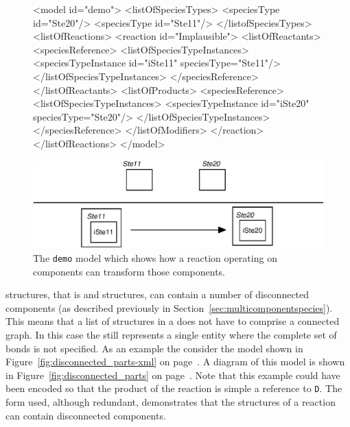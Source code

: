 \documentclass{cekarticle}
\begin{document}
\begin{figure}[h]

\begin{example}
<model id="demo">
    <listOfSpeciesTypes>
        <speciesType id="Ste20"/>
        <speciesType id="Ste11"/>
    </listofSpeciesTypes>
    <listOfReactions>
        <reaction id="Implausible">
            <listOfReactants>
                <speciesReference>
                    <listOfSpeciesTypeInstances>
                        <speciesTypeInstance id="iSte11" speciesType="Ste11"/>
                    </listOfSpeciesTypeInstances>
                </speciesReference>
            </listOfReactants>
            <listOfProducts>
                <speciesReference>
                    <listOfSpeciesTypeInstances>
                        <speciesTypeInstance id="iSte20" speciesType="Ste20"/>
                    </listOfSpeciesTypeInstances>
                </speciesReference>
            </listOfModifiers>
        </reaction>
    </listOfReactions>
</model>
\end{example}
  \vspace*{8pt}
  \centering
  \includegraphics[scale = 0.7]{demo.eps}
  \caption{The \texttt{demo} model which shows how a reaction operating on
  components can transform those components.}
  \label{fig:demo}
\end{figure}

 structures, that is  and
 structures, can contain a number of
disconnected components (as described previously in
Section~\ref{sec:multicomponentspecies}).  This means that a list
of  structures in a  does not have
to comprise a connected graph. In this case the
 still represents a single entity where the
complete set of bonds is not specified.  As an example the
consider the model shown in
Figure~\ref{fig:disconnected_parts-xml} on
page~\pageref{fig:disconnected_parts-xml}.  A diagram of this
model is shown in Figure~\ref{fig:disconnected_parts} on
page~\pageref{fig:disconnected_parts}. Note that this example
could have been encoded so that the product of the reaction is
simple a reference to  \texttt{D}.  The form
used, although redundant, demonstrates that the
 structures of a reaction can
contain disconnected components.
\end{document}
